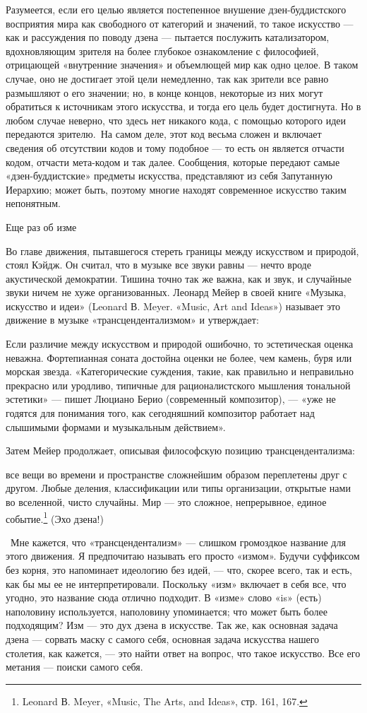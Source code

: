 Разумеется, если его целью является постепенное внушение дзен-буддистского восприятия мира как свободного от категорий и значений, то такое искусство --- как и рассуждения по поводу дзена --- пытается послужить катализатором, вдохновляющим зрителя на более глубокое ознакомление с философией, отрицающей «внутренние значения» и объемлющей мир как одно целое. В таком случае, оно не достигает этой цели немедленно, так как зрители все равно размышляют о его значении; но, в конце концов, некоторые из них могут обратиться к источникам этого искусства, и тогда его цель будет достигнута. Но в любом случае неверно, что здесь нет никакого кода, с помощью которого идеи передаются зрителю.~На самом деле, этот код весьма сложен и включает сведения об отсутствии кодов и тому подобное --- то есть он является отчасти кодом, отчасти мета-кодом и так далее. Сообщения, которые передают самые «дзен-буддистские» предметы искусства, представляют из себя Запутанную Иерархию; может быть, поэтому многие находят современное искусство таким непонятным.

Еще раз об изме

Во главе движения, пытавшегося стереть границы между искусством и природой, стоял Кэйдж. Он считал, что в музыке все звуки равны --- нечто вроде акустической демократии. Тишина точно так же важна, как и звук, и случайные звуки ничем не хуже организованных. Леонард Мейер в своей книге «Музыка, искусство и идеи» (Leonard В. Meyer. «Music, Art and Ideas») называет это движение в музыке «трансцендентализмом» и утверждает:

Если различие между искусством и природой ошибочно, то эстетическая оценка неважна. Фортепианная соната достойна оценки не более, чем камень, буря или морская звезда. «Категорические суждения, такие, как правильно и неправильно прекрасно или уродливо, типичные для рационалистского мышления тональной эстетики» --- пишет Люциано Берио (современный композитор), --- «уже не годятся для понимания того, как сегодняшний композитор работает над слышимыми формами и музыкальным действием».

Затем Мейер продолжает, описывая философскую позицию трансцендентализма:

все вещи во времени и пространстве сложнейшим образом переплетены друг с другом. Любые деления, классификации или типы организации, открытые нами во вселенной, чисто случайны. Мир --- это сложное, непрерывное, единое событие.\footnote{Leonard В. Meyer, «Music, The Arts, and Ideas», стр. 161, 167.} (Эхо дзена!)

~Мне кажется, что «трансцендентализм» --- слишком громоздкое название для этого движения. Я предпочитаю называть его просто «измом». Будучи суффиксом без корня, это напоминает идеологию без идей, --- что, скорее всего, так и есть, как бы мы ее не интерпретировали. Поскольку «изм» включает в себя все, что угодно, это название сюда отлично подходит. В «изме» слово «is» (есть) наполовину используется, наполовину упоминается; что может быть более подходящим? Изм --- это дух дзена в искусстве. Так же, как основная задача дзена --- сорвать маску с самого себя, основная задача искусства нашего столетия, как кажется, --- это найти ответ на вопрос, что такое искусство. Все его метания --- поиски самого себя.


